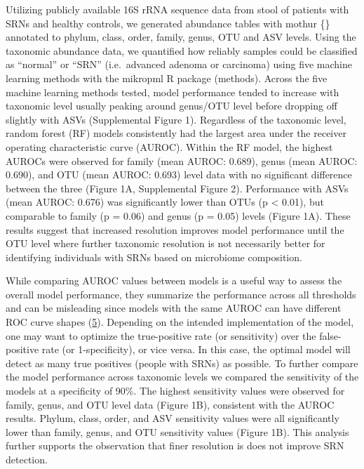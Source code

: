 \documentclass[
]{article}
\begin{document}
Utilizing publicly available 16S rRNA sequence data from stool of
patients with SRNs and healthy controls, we generated abundance tables
with mothur \{\} annotated to phylum, class, order, family, genus, OTU
and ASV levels. Using the taxonomic abundance data, we quantified how
reliably samples could be classified as ``normal'' or ``SRN''
(i.e.~advanced adenoma or carcinoma) using five machine learning methods
with the mikropml R package (methods). Across the five machine learning
methods tested, model performance tended to increase with taxonomic
level usually peaking around genus/OTU level before dropping off
slightly with ASVs (Supplemental Figure 1). Regardless of the taxonomic
level, random forest (RF) models consistently had the largest area under
the receiver operating characteristic curve (AUROC). Within the RF
model, the highest AUROCs were observed for family (mean AUROC: 0.689),
genus (mean AUROC: 0.690), and OTU (mean AUROC: 0.693) level data with
no significant difference between the three (Figure 1A, Supplemental
Figure 2). Performance with ASVs (mean AUROC: 0.676) was significantly
lower than OTUs (p \textless{} 0.01), but comparable to family (p =
0.06) and genus (p = 0.05) levels (Figure 1A). These results suggest
that increased resolution improves model performance until the OTU level
where further taxonomic resolution is not necessarily better for
identifying individuals with SRNs based on microbiome composition.

While comparing AUROC values between models is a useful way to assess
the overall model performance, they summarize the performance across all
thresholds and can be misleading since models with the same AUROC can
have different ROC curve shapes (\protect\hyperlink{ref-lobo2008}{5}).
Depending on the intended implementation of the model, one may want to
optimize the true-positive rate (or sensitivity) over the false-positive
rate (or 1-specificity), or vice versa. In this case, the optimal model
will detect as many true positives (people with SRNs) as possible. To
further compare the model performance across taxonomic levels we
compared the sensitivity of the models at a specificity of 90\%. The
highest sensitivity values were observed for family, genus, and OTU
level data (Figure 1B), consistent with the AUROC results. Phylum,
class, order, and ASV sensitivity values were all significantly lower
than family, genus, and OTU sensitivity values (Figure 1B). This
analysis further supports the observation that finer resolution is does
not improve SRN detection.
\end{document}
